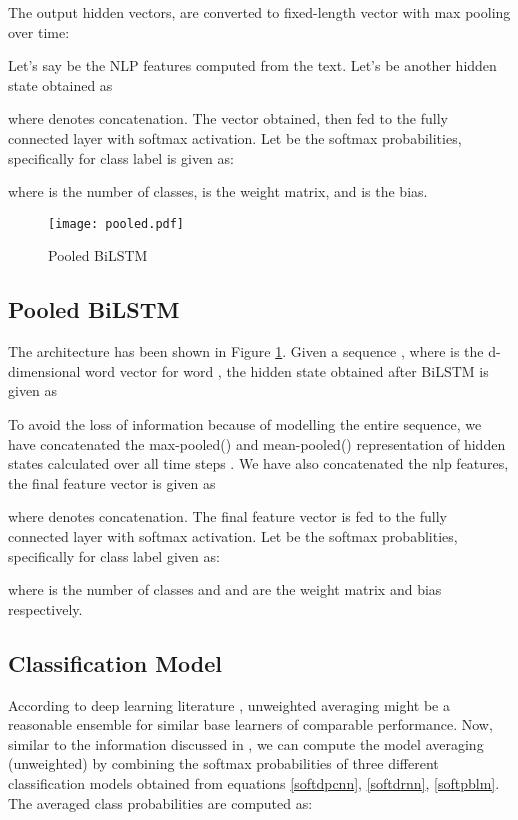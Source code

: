 \documentclass[sigconf]{acmart}
\begin{document}
The output hidden vectors,  are converted to fixed-length vector  with max pooling over time:  

Let's say  be the NLP features computed from the text. Let's  be another hidden state obtained as

where  denotes concatenation. The vector  obtained, then fed to the fully connected layer with softmax activation. Let  be the softmax probabilities, specifically for class label  is given as:

where  is the number of classes,  is the weight matrix, and
 is the bias.
\begin{figure}[t]
    \centering
    \texttt{[image: pooled.pdf]}
    \caption{Pooled BiLSTM}
    \label{fig:pooled}
    \vspace{-4mm}
\end{figure}
\raggedbottom
\subsection{Pooled BiLSTM}\label{pbilm}
The architecture has been shown in Figure \ref{fig:pooled}. Given a sequence , where  is the d-dimensional word vector for word , the hidden state obtained after BiLSTM is given as 

\raggedbottom
To avoid the loss of information because of modelling the entire sequence, we have concatenated the max-pooled() and mean-pooled() representation of hidden states calculated over all time steps \cite{RuderH18}. We have also concatenated the nlp features,  the final feature vector  is given as

where  denotes concatenation. The final feature  vector is fed to the fully connected layer with softmax activation. Let  be the softmax probablities, specifically for class label  given as:

where  is the number of classes and  and  are the weight matrix and bias respectively.
\raggedbottom
\subsection{Classification Model}\label{avgm}
According to deep learning literature \cite{simonyan2014very,szegedy2015going,he2016deep}, unweighted averaging might be a reasonable ensemble for similar base learners of comparable performance. Now, similar to the information discussed in \cite{ju2018relative}, we can compute the model averaging (unweighted) by combining the softmax probabilities of three different classification models obtained from equations \ref{softdpcnn}, \ref{softdrnn},  \ref{softpblm}. The averaged class probabilities are computed as:
\end{document}
